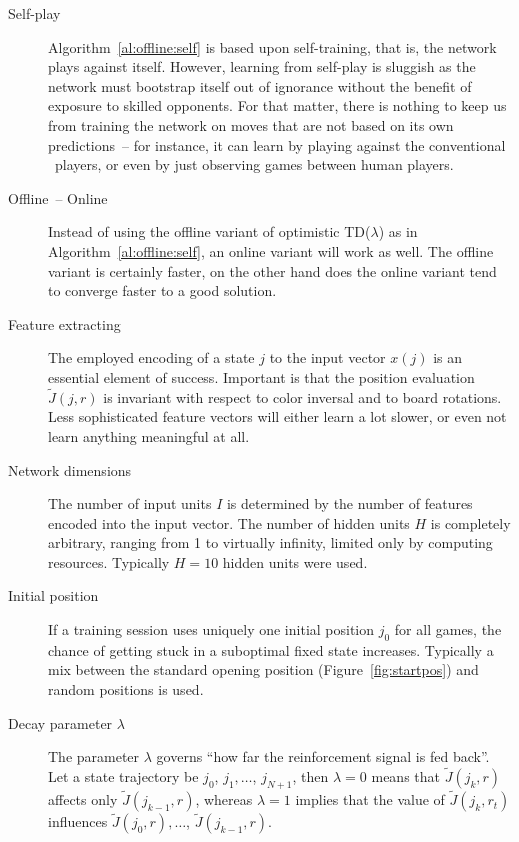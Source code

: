 \begin{description}
\item[Self-play] Algorithm~\ref{al:offline:self} is based upon self-training, that is, the network plays against itself. However, learning from self-play is sluggish as the network must bootstrap itself out of ignorance without the benefit of exposure to skilled opponents. For that matter, there is nothing to keep us from training the network on moves that are not based on its own predictions~-- for instance, it can learn by playing against the conventional \Malin\ players, or even by just observing games between human players.

\item[Offline~-- Online] Instead of using the offline variant of optimistic TD($\lambda$) as in Algorithm~\ref{al:offline:self}, an online variant will work as well. The offline variant is certainly faster, on the other hand does the online variant tend to converge faster to a good solution.

\item[Feature extracting] The employed encoding of a state $j$ to the input vector $x(j)$ is an essential element of success. Important is that the position evaluation $\tilde J(j,r)$ is invariant with respect to color inversal and to board rotations. Less sophisticated feature vectors will either learn a lot slower, or even not learn anything meaningful at all.

\item[Network dimensions] The number of input units $I$ is determined by the number of features encoded into the input vector. The number of hidden units $H$ is completely arbitrary, ranging from 1 to virtually infinity, limited only by computing resources. Typically $H=10$ hidden units were used.

\item[Initial position] If a training session uses uniquely one initial position $j_0$ for all games, the chance of getting stuck in a suboptimal fixed state increases. Typically a mix between the standard opening position (Figure~\ref{fig:startpos}) and random positions is used.

\item[Decay parameter $\lambda$] The parameter $\lambda$ governs ``how far the reinforcement signal is fed back''. Let a state trajectory be $j_0$, $j_1, \ldots$, $j_{N+1}$, then $\lambda = 0$ means that  $\tilde J(j_k,r)$ affects only $\tilde J(j_{k-1},r)$, whereas $\lambda = 1$ implies that the value of $\tilde J(j_k,r_t)$ influences $\tilde J(j_{0},r), \ldots$, $\tilde J(j_{k-1},r)$.


\end{description}

